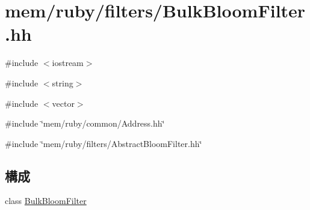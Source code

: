 \hypertarget{BulkBloomFilter_8hh}{
\section{mem/ruby/filters/BulkBloomFilter.hh}
\label{BulkBloomFilter_8hh}
}
{\ttfamily \#include $<$iostream$>$}\par
{\ttfamily \#include $<$string$>$}\par
{\ttfamily \#include $<$vector$>$}\par
{\ttfamily \#include \char`\"{}mem/ruby/common/Address.hh\char`\"{}}\par
{\ttfamily \#include \char`\"{}mem/ruby/filters/AbstractBloomFilter.hh\char`\"{}}\par
\subsection*{構成}
\begin{DoxyCompactItemize}
\item 
class \hyperlink{classBulkBloomFilter}{BulkBloomFilter}
\end{DoxyCompactItemize}
